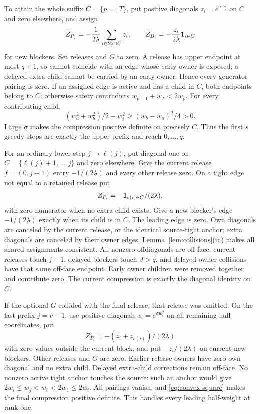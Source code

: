 To attain the whole suffix $C=\{p,\ldots,T\}$, put positive diagonals $z_i=e^{\sigma w_i^2}$ on $C$ and zero elsewhere, and assign
\begin{equation}\label{eq:upper-stress}
 Z_{P_j}=-\frac{1}{2\lambda}\sum_{i\in S_j\cap C}z_i,
 \qquad Z_{B_i}=-\frac{z_i}{2\lambda}\mathbf 1_{i\in C}
\end{equation}
for new blockers. Set releases and $G$ to zero. A release has upper endpoint at most $q+1$, so cannot coincide with an edge whose early owner is exposed; a delayed extra child cannot be carried by an early owner. Hence every generator pairing is zero. If an assigned edge is active and has a child in $C$, both endpoints belong to $C$: otherwise safety contradicts $w_{p-1}+w_T<2w_p$. For every contributing child,
\begin{equation}\label{eq:convex-square}
 (w_a^2+w_b^2)/2-w_i^2\ge(w_b-w_a)^2/4>0.
\end{equation}
Large $\sigma$ makes the compression positive definite on precisely $C$. Thus the first $s$ greedy steps are exactly the upper prefix and reach $0,\ldots,q$.

For an ordinary lower step $j\to\ell(j)$, put diagonal one on $C=\{\ell(j)+1,\ldots,j\}$ and zero elsewhere. Give the current release $f=(0,j+1)$ entry $-1/(2\lambda)$ and every other release zero. On a tight edge not equal to a retained release put
\[
 Z_{P_i}=-\mathbf 1_{c(i)\in C}/(2\lambda),
\]
with zero numerator when no extra child exists. Give a new blocker's edge $-1/(2\lambda)$ exactly when its child is in $C$. The leading edge is zero. Own diagonals are canceled by the current release, or the identical source-tight anchor; extra diagonals are canceled by their owner edges. Lemma~\ref{lem:collisions}(iii) makes all shared assignments consistent. All nonzero offdiagonals are off-face: current releases touch $j+1$, delayed blockers touch $J>q$, and delayed owner collisions have that same off-face endpoint. Early owner children were removed together and contribute zero. The current compression is exactly the diagonal identity on $C$.

If the optional $G$ collided with the final release, that release was omitted. On the last prefix $j=v-1$, use positive diagonals $z_i=e^{\sigma w_i^2}$ on all remaining null coordinates, put
\[
 Z_{P_i}=-(z_i+z_{c(i)})/(2\lambda)
\]
with zero values outside the current block, and put $-z_i/(2\lambda)$ on current new blockers. Other releases and $G$ are zero. Earlier release owners have zero own diagonal and no extra child. Delayed extra-child corrections remain off-face. No nonzero active tight anchor touches the source: such an anchor would give $2w_i\le w_j<w_v<2w_1\le2w_i$. All pairings vanish, and \eqref{eq:convex-square} makes the final compression positive definite. This handles every leading half-weight at rank one.

